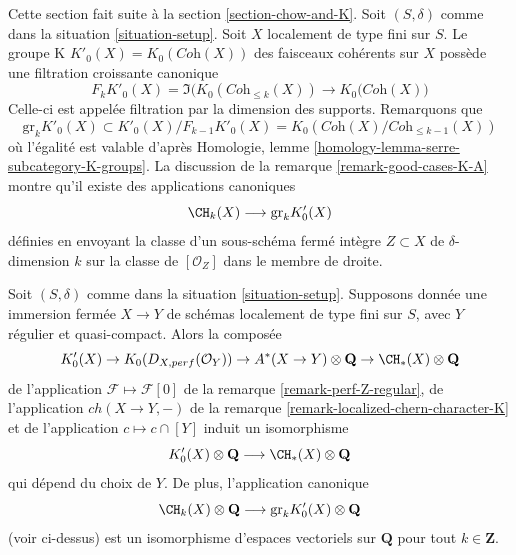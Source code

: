 \noindent
Cette section fait suite à la section \ref{section-chow-and-K}.
Soit $(S, \delta)$ comme dans la situation \ref{situation-setup}.
Soit $X$ localement de type fini sur $S$. Le groupe K
$K'_0(X) = K_0(\textit{Coh}(X))$ des faisceaux cohérents sur $X$
possède une filtration croissante canonique
$$
F_kK'_0(X) =
\Im\Big(K_0(\textit{Coh}_{\leq k}(X)) \to K_0(\textit{Coh}(X)\Big)
$$
Celle-ci est appelée filtration par la dimension des supports. Remarquons que
$$
\text{gr}_k K'_0(X) \subset K'_0(X)/F_{k - 1}K'_0(X) =
K_0(\textit{Coh}(X)/\textit{Coh}_{\leq k - 1}(X))
$$
où l'égalité est valable
d'après Homologie, lemme \ref{homology-lemma-serre-subcategory-K-groups}.
La discussion de la remarque \ref{remark-good-cases-K-A} montre
qu'il existe des applications canoniques
$$
\CH_k(X) \longrightarrow \text{gr}_k K'_0(X)
$$
définies en envoyant la classe d'un sous-schéma fermé intègre
$Z \subset X$ de $\delta$-dimension $k$ sur la classe de
$[\mathcal{O}_Z]$ dans le membre de droite.

\begin{proposition}
\label{proposition-K-tensor-Q}
Soit $(S, \delta)$ comme dans la situation \ref{situation-setup}. Supposons donnée une
immersion fermée $X \to Y$ de schémas localement de type fini sur $S$,
avec $Y$ régulier et quasi-compact. Alors la composée
$$
K'_0(X) \to
K_0(D_{X, perf}(\mathcal{O}_Y)) \to
A^*(X \to Y) \otimes \mathbf{Q} \to
\CH_*(X) \otimes \mathbf{Q}
$$
de l'application $\mathcal{F} \mapsto \mathcal{F}[0]$ de la
remarque \ref{remark-perf-Z-regular}, de l'application $ch(X \to Y, -)$ de la
remarque \ref{remark-localized-chern-character-K} et
de l'application $c \mapsto c \cap [Y]$ induit un isomorphisme
$$
K'_0(X) \otimes \mathbf{Q}
\longrightarrow
\CH_*(X) \otimes \mathbf{Q}
$$
qui dépend du choix de $Y$. De plus, l'application canonique
$$
\CH_k(X) \otimes \mathbf{Q}
\longrightarrow
\text{gr}_k K'_0(X) \otimes \mathbf{Q}
$$
(voir ci-dessus) est un isomorphisme d'espaces vectoriels sur $\mathbf{Q}$ pour tout
$k \in \mathbf{Z}$.
\end{proposition}

